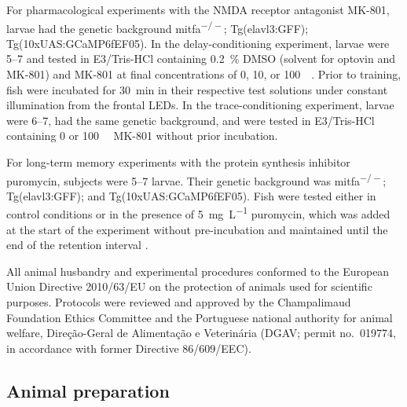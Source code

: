 
For pharmacological experiments with the NMDA receptor antagonist MK-801, larvae had the genetic background mitfa\textsuperscript{\(-/-\)}; Tg(elavl3:GFF); Tg(10xUAS:\hspace{0pt}GCaMP6fEF05). In the delay-conditioning experiment, larvae were \SIrange{5}{7}{\dpf} and tested in E3/Tris-HCl containing \SI{0.2}{\percent} DMSO (solvent for optovin and MK-801) and MK-801 at final concentrations of 0, 10, or \SI{100}{\micro\Molar}. Prior to training, fish were incubated for \SI{30}{\minute} in their respective test solutions under constant illumination from the frontal LEDs. In the trace-conditioning experiment, larvae were \SIrange{6}{7}{\dpf}, had the same genetic background, and were tested in E3/Tris-HCl containing 0 or \SI{100}{\micro\Molar} MK-801 without prior incubation.


For long-term memory experiments with the protein synthesis inhibitor puromycin, subjects were \SIrange{5}{7}{\dpf} larvae. Their genetic background was mitfa\textsuperscript{\(-/-\)}; Tg(elavl3:GFF); and Tg(10xUAS:GCaMP6fEF05). Fish were tested either in control conditions or in the presence of \SI{5}{\milli\gram\per\liter} puromycin, which was added at the start of the experiment without pre-incubation and maintained until the end of the retention interval \citep{hinzProteinSynthesisDependentAssociative2013}.


All animal husbandry and experimental procedures conformed to the European Union Directive 2010/63/EU on the protection of animals used for scientific purposes. Protocols were reviewed and approved by the Champalimaud Foundation Ethics Committee and the Portuguese national authority for animal welfare, Direção-Geral de Alimentação e Veterinária (DGAV; permit no.~019774, in accordance with former Directive 86/609/EEC).


\subsection{Animal preparation}

